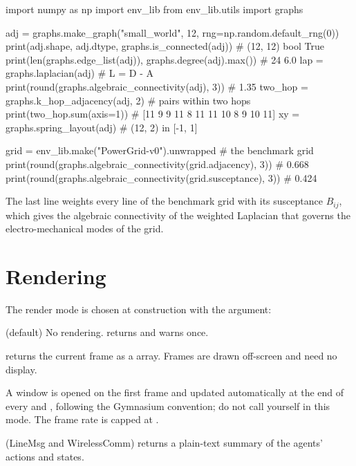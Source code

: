 \begin{pycode}
import numpy as np
import env_lib
from env_lib.utils import graphs

adj = graphs.make_graph("small_world", 12, rng=np.random.default_rng(0))
print(adj.shape, adj.dtype, graphs.is_connected(adj))  # (12, 12) bool True
print(len(graphs.edge_list(adj)), graphs.degree(adj).max())  # 24 6.0
lap = graphs.laplacian(adj)                            # L = D - A
print(round(graphs.algebraic_connectivity(adj), 3))    # 1.35
two_hop = graphs.k_hop_adjacency(adj, 2)               # pairs within two hops
print(two_hop.sum(axis=1))             # [11  9  9 11  8 11 11 10  8  9 10 11]
xy = graphs.spring_layout(adj)                         # (12, 2) in [-1, 1]

grid = env_lib.make("PowerGrid-v0").unwrapped          # the benchmark grid
print(round(graphs.algebraic_connectivity(grid.adjacency), 3))     # 0.668
print(round(graphs.algebraic_connectivity(grid.susceptance), 3))   # 0.424
\end{pycode}

The last line weights every line of the benchmark grid with its susceptance
$B_{ij}$, which gives the algebraic connectivity of the weighted Laplacian that
governs the electro-mechanical modes of the grid.

\section{Rendering}\label{sec:envlib-rendering}

The render mode is chosen at construction with the 
argument:

\begin{description}[style=nextline,leftmargin=2.8cm]
  \item[\code{None}] (default) No rendering.  returns
     and warns once.
  \item[\code{"rgb\_array"}]  returns the current frame as a
      array. Frames are drawn off-screen and need
    no display.
  \item[\code{"human"}] A window is opened on the first frame and updated
    automatically at the end of every  and ,
    following the Gymnasium convention; do not call  yourself
    in this mode. The frame rate is capped at .
  \item[\code{"ansi"}] (LineMsg and WirelessComm)  returns a
    plain-text summary of the agents' actions and states.
\end{description}

